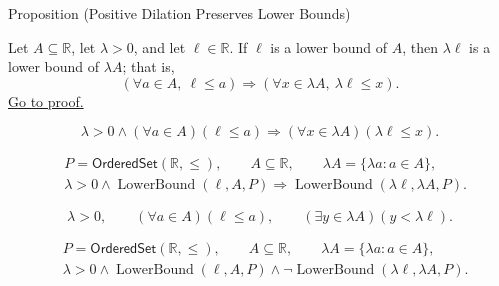 \begin{propositionbox}{Proposition (Positive Dilation Preserves Lower Bounds)}
\begin{proposition}
\label{prop:positive-dilation-preserves-lower-bounds}
Let $A\subseteq\mathbb{R}$, let $\lambda>0$, and let
$\ell\in\mathbb{R}$.  If $\ell$ is a lower bound of $A$, then
$\lambda\ell$ is a lower bound of $\lambda A$; that is,
\[
\left(\forall a\in A,\ \ell\leq a\right)
\Longrightarrow
\left(\forall x\in\lambda A,\ \lambda\ell\leq x\right).
\]
\hyperref[prf:positive-dilation-preserves-lower-bounds]{Go to proof.}
\end{proposition}
\end{propositionbox}

\begin{remark*}
\[
\lambda>0\land(\forall a\in A)(\ell\leq a)
\Longrightarrow
(\forall x\in\lambda A)(\lambda\ell\leq x).
\]
\end{remark*}

\begin{remark*}
\[
\begin{aligned}
&P=\mathsf{OrderedSet}(\mathbb{R},\leq),\qquad
A\subseteq\mathbb{R},\qquad \lambda A=\{\lambda a:a\in A\},\\
&\lambda>0\land\operatorname{LowerBound}(\ell,A,P)
\Longrightarrow\operatorname{LowerBound}(\lambda\ell,\lambda A,P).
\end{aligned}
\]
\end{remark*}

\begin{remark*}
\[
\lambda>0,\qquad(\forall a\in A)(\ell\leq a),\qquad
(\exists y\in\lambda A)(y<\lambda\ell).
\]
\end{remark*}

\begin{remark*}
\[
\begin{aligned}
&P=\mathsf{OrderedSet}(\mathbb{R},\leq),\qquad
A\subseteq\mathbb{R},\qquad \lambda A=\{\lambda a:a\in A\},\\
&\lambda>0\land\operatorname{LowerBound}(\ell,A,P)\land
\neg\operatorname{LowerBound}(\lambda\ell,\lambda A,P).
\end{aligned}
\]
\end{remark*}

